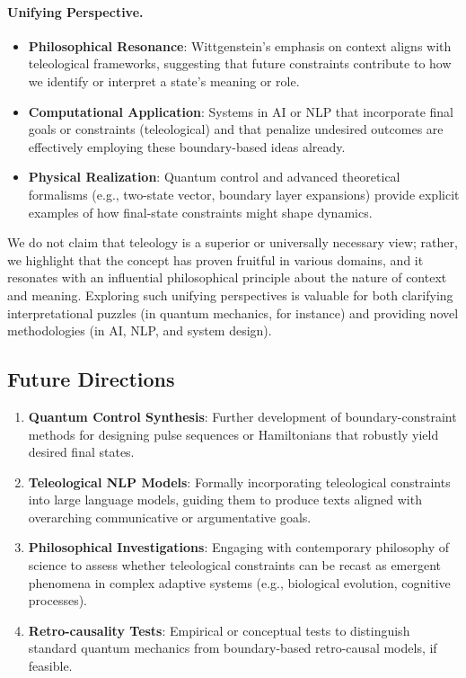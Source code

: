 \documentclass[11pt]{article}
\begin{document}
\paragraph{Unifying Perspective.} 
\begin{itemize}
    \item \textbf{Philosophical Resonance}: Wittgenstein’s emphasis on context aligns with teleological frameworks, suggesting that future constraints contribute to how we identify or interpret a state’s meaning or role.
    \item \textbf{Computational Application}: Systems in AI or NLP that incorporate final goals or constraints (teleological) and that penalize undesired outcomes are effectively employing these boundary-based ideas already.
    \item \textbf{Physical Realization}: Quantum control and advanced theoretical formalisms (e.g., two-state vector, boundary layer expansions) provide explicit examples of how final-state constraints might shape dynamics.
\end{itemize}

We do not claim that teleology is a superior or universally necessary view; rather, we highlight that the concept has proven fruitful in various domains, and it resonates with an influential philosophical principle about the nature of context and meaning. Exploring such unifying perspectives is valuable for both clarifying interpretational puzzles (in quantum mechanics, for instance) and providing novel methodologies (in AI, NLP, and system design).

\subsection*{Future Directions}
\begin{enumerate}
    \item \textbf{Quantum Control Synthesis}: Further development of boundary-constraint methods for designing pulse sequences or Hamiltonians that robustly yield desired final states.
    \item \textbf{Teleological NLP Models}: Formally incorporating teleological constraints into large language models, guiding them to produce texts aligned with overarching communicative or argumentative goals.
    \item \textbf{Philosophical Investigations}: Engaging with contemporary philosophy of science to assess whether teleological constraints can be recast as emergent phenomena in complex adaptive systems (e.g., biological evolution, cognitive processes).
    \item \textbf{Retro-causality Tests}: Empirical or conceptual tests to distinguish standard quantum mechanics from boundary-based retro-causal models, if feasible.
\end{enumerate}
\end{document}
